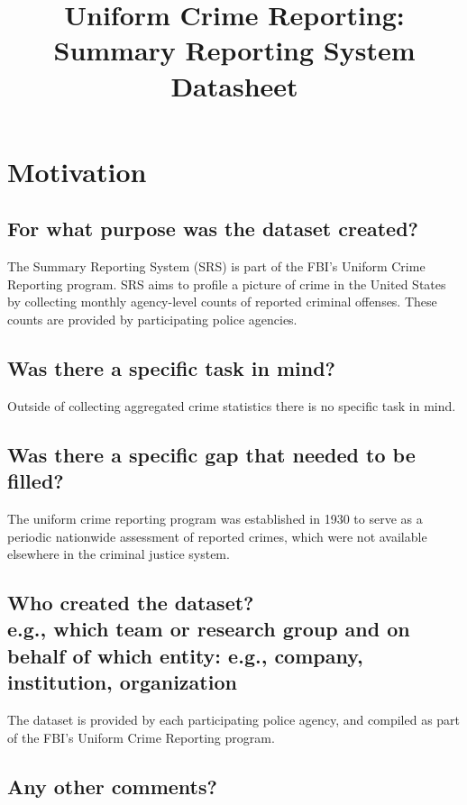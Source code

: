 \documentclass[letterpaper, 10 pt, conference]{ieeeconf}  %
\title{\LARGE \bf
Uniform Crime Reporting: Summary Reporting System \\{\color{blue}Datasheet}
}
\newcommand{\subtitle}[1]{{\\ \small \normalfont \color{purple} #1}}
\begin{document}
\maketitle
\thispagestyle{empty}
\pagestyle{empty}

\section{Motivation}

\subsection{For what purpose was the dataset created?}

The Summary Reporting System (SRS) is part of the FBI's Uniform Crime Reporting program. SRS aims to profile a picture of crime in the United States by collecting monthly agency-level counts of reported criminal offenses. These counts are provided by participating police agencies. 

\subsection{Was there a specific task in mind?}

Outside of collecting aggregated crime statistics there is no specific task in mind.

\subsection{Was there a specific gap that needed to be filled?}

The uniform crime reporting program was established in 1930 to serve as a periodic nationwide assessment of reported crimes, which were not available elsewhere in the criminal justice system.

\subsection{Who created the dataset? \subtitle{e.g., which team or research group and on behalf of which entity: e.g., company, institution, organization}}

The dataset is provided by each participating police agency, and compiled as part of the FBI's Uniform Crime Reporting program.

\subsection{Any other comments?}
\end{document}
